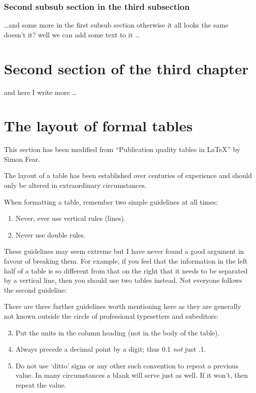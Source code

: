 \subsubsection{Second subsub section in the third subsection}
\dots and some more in the first subsub section otherwise it all looks the same
doesn't it? well we can add some text to it \dots

\section{Second section of the third chapter}
and here I write more \dots

\section{The layout of formal tables}
This section has been modified from ``Publication quality tables in \LaTeX*''
 by Simon Fear.

The layout of a table has been established over centuries of experience and 
should only be altered in extraordinary circumstances. 

When formatting a table, remember two simple guidelines at all times:

\begin{enumerate}
  \item Never, ever use vertical rules (lines).
  \item Never use double rules.
\end{enumerate}

These guidelines may seem extreme but I have
never found a good argument in favour of breaking them. For
example, if you feel that the information in the left half of
a table is so different from that on the right that it needs
to be separated by a vertical line, then you should use two
tables instead. Not everyone follows the second guideline:

There are three further guidelines worth mentioning here as they
are generally not known outside the circle of professional
typesetters and subeditors:

\begin{enumerate}\setcounter{enumi}{2}
  \item Put the units in the column heading (not in the body of
          the table).
  \item Always precede a decimal point by a digit; thus 0.1
      {\em not} just .1.
  \item Do not use `ditto' signs or any other such convention to
      repeat a previous value. In many circumstances a blank
      will serve just as well. If it won't, then repeat the value.
\end{enumerate}

